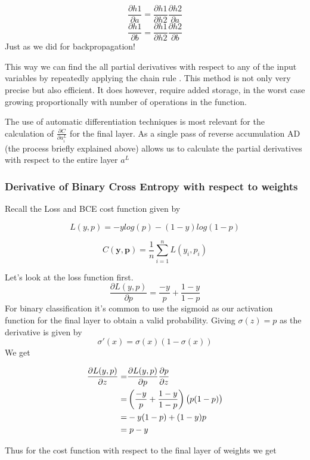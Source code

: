 \documentclass{article}
\theoremstyle{definition}
\begin{document}
\[
\frac{\partial h1}{\partial a} =  \frac{\partial h1}{\partial h2} \frac{\partial h2}{\partial a}
\]
\[
\frac{\partial h1}{\partial b} =  \frac{\partial h1}{\partial h2} \frac{\partial h2}{\partial b}
\]
Just as we did for backpropagation!

This way we can find the all partial derivatives with respect to any of the input variables by repeatedly applying the chain rule \parencite{walther2007automatic} . This method is not only very precise but also efficient. It does however, require added storage, in the worst case growing proportionally with number of operations in the function.
\parencite{baydin2018automatic}

The use of automatic differentiation techniques is most relevant for the calculation of $\frac{\partial C}{\partial a_i^L}$ for the final layer. As a single pass of reverse accumulation AD (the process briefly explained above) allows us to calculate the partial derivatives with respect to the entire layer $a^L$


\subsubsection{Derivative of Binary Cross Entropy with respect to weights}
Recall the Loss and BCE cost function given by

\[
L(y, p) = -ylog(p) - (1-y)log(1-p)
\]

\[
C(\mathbf{y}, \mathbf{p}) = \frac{1}{n} \sum_{i=1}^{n} L(y_i, p_i)
\]


Let's look at the loss function first.
\[
\frac{\partial L(y,p)}{\partial p} = \frac{-y}{p} + \frac{1-y}{1-p} 
\]
For binary classification it's common to use the sigmoid as our activation function for the final layer to obtain a valid probability. Giving $\sigma(z) = p$ as the derivative is given by
\[
\sigma'(x) = \sigma(x)(1-\sigma(x))
\]
We get 

\begin{align*}
\frac{\partial L(y,p)}{\partial z} =& \frac{\partial L(y,p)}{\partial p} \frac{\partial p}{\partial z} \\
=& \left(\frac{-y}{p} + \frac{1-y}{1-p}\right) \left(p(1-p)\right)\\
=& -y(1-p) + (1-y)p\\
=& \hspace{1mm} p-y 
\end{align*}

Thus for the cost function with respect to the final layer of weights we get
\end{document}
